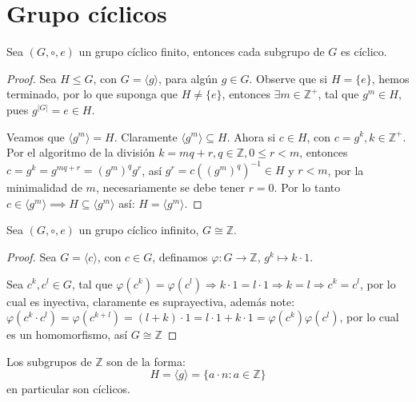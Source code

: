 \section{Grupo cíclicos}%
\label{sec:Grupo cíclicos}

\begin{prop}
	Sea $(G, \circ, e)$ un grupo cíclico finito, entonces cada subgrupo de $G$ es cíclico.
\end{prop}

\begin{proof}
	Sea $H \le G$, con $G = \langle g \rangle$, para algún $g \in G$. Observe que si $H=\{e\}$, hemos terminado, por lo que suponga que $H \neq \{e\}$, entonces $\exists m \in \mathbb{Z}^+$, tal que $g^m \in H$, pues $g^{|G|} = e \in H$.

	Veamos que $\langle g^m \rangle = H$. Claramente $\langle g^m \rangle \subseteq H$. Ahora si $c \in H$, con $c = g^k, k \in \mathbb{Z}^+$. Por el algoritmo de la división $k = mq + r, q \in \mathbb{Z}, 0 \le r < m$, entonces $c = g^k = g^{mq+r} = (g^m)^q g^r$, así $g^r = c ((g^m)^q)^{-1} \in H$ y $r < m$, por la minimalidad de $m$, necesariamente se debe tener $r=0$. Por lo tanto $c \in \langle g^m \rangle \implies H \subseteq \langle g^m \rangle$ así: $H = \langle g^m \rangle$.
\end{proof}

\begin{prop}
	Sea $(G, \circ, e)$ un grupo cíclico infinito, $G \cong \mathbb{Z}$.
\end{prop}

\begin{proof}
	Sea $G = \langle c \rangle$, con $c \in G$, definamos $\varphi: G \to \mathbb{Z}$, $g^k \mapsto k \cdot 1$.

	Sea $c^k, c^l \in G$, tal que $\varphi(c^k) = \varphi(c^l) \Rightarrow k \cdot 1 = l \cdot 1 \Rightarrow k=l \Rightarrow c^k = c^l$, por lo cual es inyectiva, claramente es suprayectiva, además note:
	$\varphi(c^k \cdot c^l) = \varphi(c^{k+l}) = (l+k) \cdot 1 = l \cdot 1 + k \cdot 1 = \varphi(c^k) \varphi(c^l)$, por lo cual es un homomorfismo, así
	$G \cong \mathbb{Z}$
\end{proof}

\begin{eje}
	Los subgrupos de $\mathbb{Z}$ son de la forma:
	\begin{equation*}
		H = \langle g \rangle = \{ a \cdot n : a \in \mathbb{Z} \}
	\end{equation*}
	en particular son cíclicos.
\end{eje}

